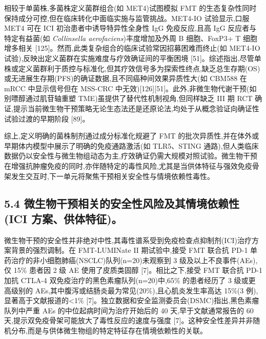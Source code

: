\documentclass[11pt]{article}
\begin{document}
相较于单菌株,多菌株定义菌群组合(如 MET4)试图模拟 FMT 的生态复杂性同时保持成分可控,但在临床转化中面临实施与监管挑战。MET4-IO 试验显示,口服 MET4 可在 ICI 初治患者中诱导特异性全身性 IgG 免疫反应,且高 IgG 反应者与特定有益菌(如 \emph{Collinsella aerofaciens})丰度增加及外周 B 细胞、FoxP3+ T 细胞增多相关 {[}125{]}。然而,此类复杂组合的临床试验常因招募困难而终止(如 MET4-IO 试验),反映出定义菌群在实施难度与疗效确证间的平衡困境 {[}51{]}。综述指出,尽管单株或定义菌群利于质控与标准化,但其疗效信号多为探索性终点,缺乏总生存期(OS)或无进展生存期(PFS)的确证数据,且不同癌种间效果异质性大(如 CBM588 在 mRCC 中显示信号但在 MSS-CRC 中无效){[}126{]}{[}51{]}。此外,非微生物代谢干预(如别嘌醇通过肌苷轴重塑 TME)虽提供了替代性机制视角,但同样缺乏 III 期 RCT 确证,提示当前微生物干预策略无论生态法还是还原论法,均处于从概念验证向确证性试验过渡的早期阶段 {[}89{]}。

综上,定义明确的菌株制剂通过成分标准化规避了 FMT 的批次异质性,并在体外或早期体内模型中展示了明确的免疫通路激活(如 TLR5、STING 通路),但人类临床数据仍以安全性与微生物组动态为主,疗效确证仍需大规模对照试验。微生物干预在增强抗肿瘤免疫的同时,亦伴随特定的毒性风险,尤其是当供体特征与强效免疫骨架发生交互时,下一单元将聚焦干预相关安全性与情境依赖性毒性。

\subsection{5.4 微生物干预相关的安全性风险及其情境依赖性(ICI 方案、供体特征)。}\label{ux5faeux751fux7269ux5e72ux9884ux76f8ux5173ux7684ux5b89ux5168ux6027ux98ceux9669ux53caux5176ux60c5ux5883ux4f9dux8d56ux6027ici-ux65b9ux6848ux4f9bux4f53ux7279ux5f81}

微生物干预的安全性并非绝对中性,其毒性谱系受到免疫检查点抑制剂(ICI)治疗方案背景的强烈调制。在 FMT-LUMINate II 期试验中,接受 FMT 联合抗 PD-1 单药治疗的非小细胞肺癌(NSCLC)队列(n=20)未观察到 3 级及以上不良事件(AEs),仅 15\% 患者因 2 级 AE 使用了皮质类固醇 {[}7{]}。相比之下,接受 FMT 联合抗 PD-1 加抗 CTLA-4 双免疫治疗的黑色素瘤队列(n=20)中,65\% 的患者经历了 3 级或更高级别的 AEs,其中腹泻或结肠炎最为常见(20\%),且心肌炎发生率高达 15\%(3 例),显著高于文献报道的\textless1\% {[}7{]}。独立数据和安全监测委员会(DSMC)指出,黑色素瘤队列中严重 AEs 的中位起病时间为治疗开始后的 40 天,早于文献通常报告的 60 天,提示双免疫骨架可能放大了毒性反应的速度与强度 {[}7{]}。这种安全性差异并非随机分布,而是与供体微生物组的特定特征存在情境依赖性的关联。
\end{document}
